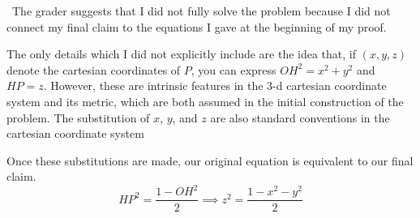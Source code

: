 \documentclass{article}
\begin{document}
\
The grader suggests that I did not fully solve the problem because I did not connect my final claim to the equations I gave at the beginning of my proof.

The only details which I did not explicitly include are the idea that, if $(x,y,z)$ denote the cartesian coordinates of $P$, you can express $OH^2 = x^2+y^2$ and $HP = z$.
However, these are intrinsic features in the 3-d cartesian coordinate system and its metric, which are both assumed in the initial construction of the problem.
The substitution of $x$, $y$, and $z$ are also standard conventions in the cartesian coordinate system

Once these substitutions are made, our original equation is equivalent to our final claim.
$$HP^2 = \frac{1-OH^2}{2} \implies z^2 = \frac{1-x^2-y^2}{2}$$
\end{document}
